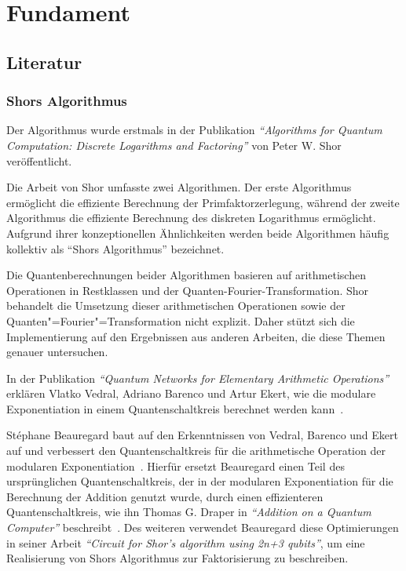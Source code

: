 \section{Fundament}
\subsection{Literatur} 
\subsubsection*{Shors Algorithmus}
Der Algorithmus wurde erstmals in der Publikation \textit{"`Algorithms for Quantum Computation: Discrete Logarithms and Factoring"'} von Peter W. Shor veröffentlicht.

Die Arbeit von Shor umfasste zwei Algorithmen.
Der erste Algorithmus ermöglicht die effiziente Berechnung der Primfaktorzerlegung, 
während der zweite Algorithmus die effiziente Berechnung des diskreten Logarithmus ermöglicht.
Aufgrund ihrer konzeptionellen Ähnlichkeiten werden beide Algorithmen häufig kollektiv als "`Shors Algorithmus"' bezeichnet.

Die Quantenberechnungen beider Algorithmen basieren auf arithmetischen Operationen in Restklassen und der Quanten-Fourier-Transformation. 
Shor behandelt die Umsetzung dieser arithmetischen Operationen sowie der Quanten"=Fourier"=Transformation nicht explizit. 
Daher stützt sich die Implementierung auf den Ergebnissen aus anderen Arbeiten, die diese Themen genauer untersuchen.

In der Publikation \textit{"`Quantum Networks for Elementary Arithmetic Operations"'} erklären Vlatko Vedral,  Adriano Barenco und Artur Ekert,
wie die modulare Exponentiation in einem Quantenschaltkreis berechnet werden kann~\cite{Vedral_1996}. 

St\'{e}phane Beauregard baut auf den Erkenntnissen von Vedral, Barenco und Ekert auf und
verbessert den Quantenschaltkreis für die arithmetische Operation der modularen Exponentiation~\cite{beauregard2003circuit}.
Hierfür ersetzt Beauregard einen Teil des ursprünglichen Quantenschaltkreis,
der in der modularen Exponentiation für die Berechnung der Addition genutzt wurde, 
durch einen effizienteren Quantenschaltkreis,
wie ihn Thomas G. Draper in \textit{"`Addition on a Quantum Computer"'} beschreibt~\cite{draper2000addition}.
Des weiteren verwendet Beauregard diese Optimierungen in seiner Arbeit \textit{"`Circuit for Shor’s algorithm using 2n+3 qubits"'},
um eine Realisierung von Shors Algorithmus zur Faktorisierung zu beschreiben.

